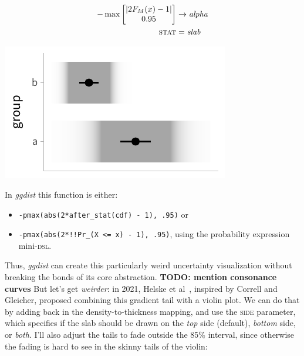 \documentclass[journal]{vgtc}                     %
\begin{document}
\noindent
\begin{minipage}{.5\columnwidth}

\begin{align*}
-\max \left[ \begin{matrix} \lvert 2 F_M(x) - 1 \rvert \\ 0.95 \end{matrix} \right] &\rightarrow \textit{alpha}\\
\textsc{stat} &= \mathit{slab}
\end{align*}
\end{minipage}%
  \begin{minipage}{.4\columnwidth}
    \centering
    \includegraphics[width=1.2\columnwidth]{figs/3-slab_gradient_correll.pdf}
  \end{minipage}
\hfill\break

In \textit{ggdist} this function is either:
\begin{itemize}
    \item \texttt{-pmax(abs(2*after\_stat(cdf) - 1), .95)} or
    \item    \texttt{-pmax(abs(2*!!Pr\_(X <= x) - 1), .95)}, using the probability expression mini-\textsc{dsl}.
\end{itemize}

Thus, \textit{ggdist} can create this particularly weird uncertainty visualization without breaking the bonds of its core abstraction. \textbf{TODO: mention consonance curves}  But let's get \textit{weirder}: in 2021, Helske et al~\cite{helske2021can}, inspired by Correll and Gleicher, proposed combining this gradient tail with a violin plot. We can do that by adding back in the density-to-thickness mapping, and use the \textsc{side} parameter, which specifies if the slab should be drawn on the \textit{top} side (default), \textit{bottom} side, or \textit{both}. I'll also adjust the tails to fade outside the 85\% interval, since otherwise the fading is hard to see in the skinny tails of the violin:
\end{document}
